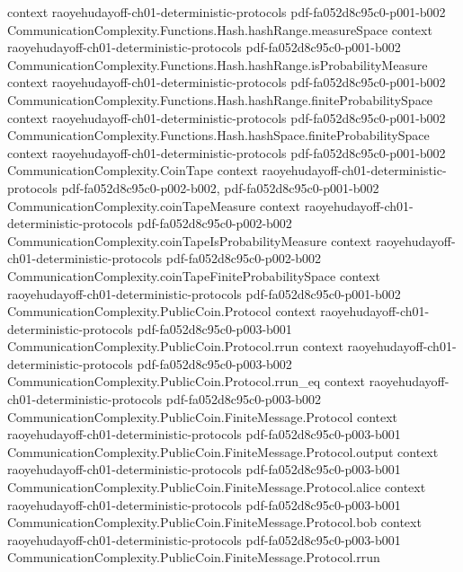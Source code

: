 \begin{theorem}
  {context}
  {raoyehudayoff-ch01-deterministic-protocols}
  {pdf-fa052d8c95c0-p001-b002}
\proofstep
  {CommunicationComplexity.Functions.Hash.hashRange.measureSpace}
  {context}
  {raoyehudayoff-ch01-deterministic-protocols}
  {pdf-fa052d8c95c0-p001-b002}
\proofstep
  {CommunicationComplexity.Functions.Hash.hashRange.isProbabilityMeasure}
  {context}
  {raoyehudayoff-ch01-deterministic-protocols}
  {pdf-fa052d8c95c0-p001-b002}
\proofstep
  {CommunicationComplexity.Functions.Hash.hashRange.finiteProbabilitySpace}
  {context}
  {raoyehudayoff-ch01-deterministic-protocols}
  {pdf-fa052d8c95c0-p001-b002}
\proofstep
  {CommunicationComplexity.Functions.Hash.hashSpace.finiteProbabilitySpace}
  {context}
  {raoyehudayoff-ch01-deterministic-protocols}
  {pdf-fa052d8c95c0-p001-b002}
\proofstep
  {CommunicationComplexity.CoinTape}
  {context}
  {raoyehudayoff-ch01-deterministic-protocols}
  {pdf-fa052d8c95c0-p002-b002,
    pdf-fa052d8c95c0-p001-b002}
\proofstep
  {CommunicationComplexity.coinTapeMeasure}
  {context}
  {raoyehudayoff-ch01-deterministic-protocols}
  {pdf-fa052d8c95c0-p002-b002}
\proofstep
  {CommunicationComplexity.coinTapeIsProbabilityMeasure}
  {context}
  {raoyehudayoff-ch01-deterministic-protocols}
  {pdf-fa052d8c95c0-p002-b002}
\proofstep
  {CommunicationComplexity.coinTapeFiniteProbabilitySpace}
  {context}
  {raoyehudayoff-ch01-deterministic-protocols}
  {pdf-fa052d8c95c0-p001-b002}
\proofstep
  {CommunicationComplexity.PublicCoin.Protocol}
  {context}
  {raoyehudayoff-ch01-deterministic-protocols}
  {pdf-fa052d8c95c0-p003-b001}
\proofstep
  {CommunicationComplexity.PublicCoin.Protocol.rrun}
  {context}
  {raoyehudayoff-ch01-deterministic-protocols}
  {pdf-fa052d8c95c0-p003-b002}
\proofstep
  {CommunicationComplexity.PublicCoin.Protocol.rrun_eq}
  {context}
  {raoyehudayoff-ch01-deterministic-protocols}
  {pdf-fa052d8c95c0-p003-b002}
\proofstep
  {CommunicationComplexity.PublicCoin.FiniteMessage.Protocol}
  {context}
  {raoyehudayoff-ch01-deterministic-protocols}
  {pdf-fa052d8c95c0-p003-b001}
\proofstep
  {CommunicationComplexity.PublicCoin.FiniteMessage.Protocol.output}
  {context}
  {raoyehudayoff-ch01-deterministic-protocols}
  {pdf-fa052d8c95c0-p003-b001}
\proofstep
  {CommunicationComplexity.PublicCoin.FiniteMessage.Protocol.alice}
  {context}
  {raoyehudayoff-ch01-deterministic-protocols}
  {pdf-fa052d8c95c0-p003-b001}
\proofstep
  {CommunicationComplexity.PublicCoin.FiniteMessage.Protocol.bob}
  {context}
  {raoyehudayoff-ch01-deterministic-protocols}
  {pdf-fa052d8c95c0-p003-b001}
\proofstep
  {CommunicationComplexity.PublicCoin.FiniteMessage.Protocol.rrun}

\end{theorem}
